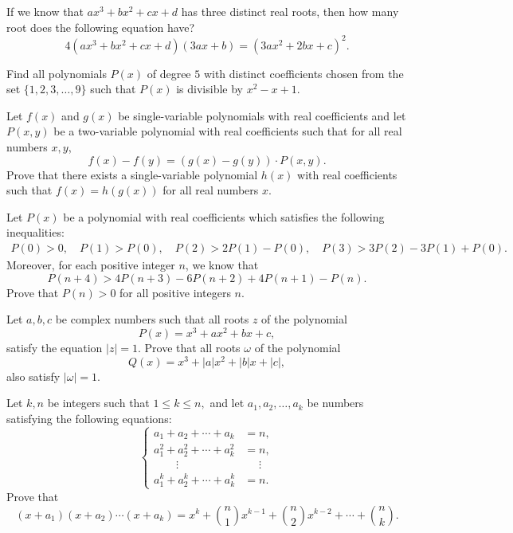 \documentclass[12pt,a4paper]{memoir}
\theoremstyle{definition}
\begin{document}
\begin{question}[name={1997 Ukraine}]
	If we know that $ax^3+bx^2+cx+d$ has three distinct real roots, then how many root does the following equation have?
	\[4(ax^3+bx^2+cx+d)(3ax+b) = (3ax^2+2bx+c)^2.\]
\end{question}

\begin{question}[name={1997 British Math Olympiad}]
	Find all polynomials $P(x)$ of degree $5$ with distinct coefficients chosen from the set $\{1,2,3,\dots,9\}$ such that $P(x)$ is divisible by $x^2-x+1$.
\end{question}


\begin{question}
	Let $f(x)$ and $g(x)$ be single-variable polynomials with real coefficients and let $P(x,y)$ be a two-variable polynomial with real coefficients such that for all real numbers $x,y$, \[f(x)-f(y)=(g(x)-g(y)) \cdot P(x,y).\] Prove that there exists a single-variable polynomial $h(x)$ with real coefficients such that $f(x)=h(g(x))$ for all real numbers $x$.
\end{question}


\begin{question}
	Let $P(x)$ be a polynomial with real coefficients which satisfies the following inequalities:
	\begin{align*}
		P(0) >0, \quad P(1)>P(0), \quad P(2) > 2P(1) - P(0), \quad P(3) > 3P(2) - 3P(1) + P(0).
	\end{align*}
	Moreover, for each positive integer $n$, we know that
	\[P(n+4) > 4P(n+3) - 6P(n+2) + 4P(n+1) - P(n).\]
	Prove that $P(n)>0$ for all positive integers $n$.
\end{question}


\begin{question}[name={1995 Ireland}]
	Let $a,b,c$ be complex numbers such that all roots $z$ of the polynomial
	\[P(x)=x^3+ax^2+bx+c,\] satisfy the equation $|z|=1$. Prove that all roots $\omega$ of the polynomial \[Q(x)=x^3 + |a|x^2 + |b|x + |c|,\] also satisfy $|\omega|=1$.
\end{question}


\begin{question}[name={1995 Japan}]
	Let $k,n$ be integers such that $1\leq k\leq n,$ and let $a_1, a_2, \dots, a_k$ be numbers satisfying the following equations:
	\[ \begin{cases} a_1+a_2+\cdots+a_k &= n, \\ a_1^2+a_2^2 +\cdots +a_k^2 &= n,\\ \qquad \vdots &\phantom{=} \vdots \\ a_1^k+a_2^k+\cdots+a_k^k &= n. \end{cases} \]
	Prove that \[(x+a_1)(x+a_2)\cdots(x+a_k) = x^k+\binom{n}{1} x^{k-1} + \binom{n}{2} x^{k-2}+\cdots+ \binom{n}{k}.\]
\end{question}
\end{document}

